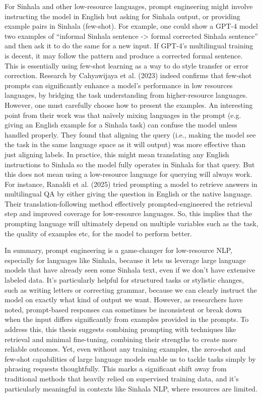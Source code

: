 \documentclass[12pt]{uomthesis}
\begin{document}
For Sinhala and other low-resource languages, prompt engineering might involve instructing the model in English but asking for Sinhala output, or providing example pairs in Sinhala (few-shot). For example, one could show a GPT-4 model two examples of “informal Sinhala sentence -> formal corrected Sinhala sentence” and then ask it to do the same for a new input. If GPT-4’s multilingual training is decent, it may follow the pattern and produce a corrected formal sentence. This is essentially using few-shot learning as a way to do style transfer or error correction. Research by Cahyawijaya et al. (2023) \cite{24} indeed confirms that few-shot prompts can significantly enhance a model’s performance in low resources languages, by bridging the task understanding from higher-resource languages. However, one must carefully choose how to present the examples. An interesting point from their work was that naïvely mixing languages in the prompt (e.g. giving an English example for a Sinhala task) can confuse the model unless handled properly. They found that aligning the query (i.e., making the model see the task in the same language space as it will output) was more effective than just aligning labels. In practice, this might mean translating any English instructions to Sinhala so the model fully operates in Sinhala for that query. But this does not mean using a low-resource language for querying will always work. For instance, Ranaldi et al. (2025) tried prompting a model to retrieve answers in multilingual QA by either giving the question in English or the native language. Their translation-following method effectively prompted-engineered the retrieval step and improved coverage for low-resource languages. So, this implies that the prompting language will ultimately depend on multiple variables such as the task, the quality of examples etc, for the model to perform better.

In summary, prompt engineering is a game-changer for low-resource NLP, especially for languages like Sinhala, because it lets us leverage large language models that have already seen some Sinhala text, even if we don’t have extensive labeled data. It’s particularly helpful for structured tasks or stylistic changes, such as writing letters or correcting grammar, because we can clearly instruct the model on exactly what kind of output we want.
However, as researchers have noted, prompt-based responses can sometimes be inconsistent or break down when the input differs significantly from examples provided in the prompts. To address this, this thesis suggests combining prompting with techniques like retrieval and minimal fine-tuning, combining their strengths to create more reliable outcomes.
Yet, even without any training examples, the zero-shot and few-shot capabilities of large language models enable us to tackle tasks simply by phrasing requests thoughtfully. This marks a significant shift away from traditional methods that heavily relied on supervised training data, and it’s particularly meaningful in contexts like Sinhala NLP, where resources are limited.
\end{document}
